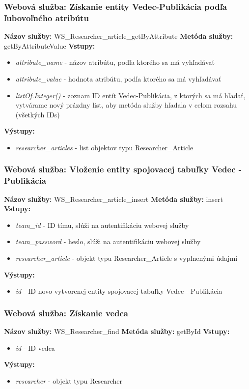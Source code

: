 \documentclass[10pt,oneside,slovak,a4paper]{article}
\begin{document}
\subsubsection{Webová služba: Získanie entity Vedec-Publikácia podľa ľubovoľného atribútu}
\textbf{Názov služby:} WS\_Researcher\_article\_getByAttribute
\textbf{Metóda služby:} getByAttributeValue
\textbf{Vstupy:}
	\begin{itemize}
		\item \textit{attribute\_name} - názov atribútu, podľa ktorého sa má vyhľadávať
		\item \textit{attribute\_value} - hodnota atribútu, podľa ktorého sa má vyhľadávať
		\item \textit{listOf.Integer()} - zoznam ID entít Vedec-Publikácia, z ktorých sa má hľadať, vytvárame nový prázdny list, aby metóda služby hľadala v celom rozsahu (všetkých IDs)
	\end{itemize}
\textbf{Výstupy:}
	\begin{itemize}
		\item \textit{researcher\_articles} - list objektov typu Researcher\_Article
	\end{itemize}
	
\subsubsection{Webová služba: Vloženie entity spojovacej tabuľky Vedec - Publikácia}
\textbf{Názov služby:} WS\_Researcher\_article\_insert
\textbf{Metóda služby:} insert
\textbf{Vstupy:}
	\begin{itemize}
		\item \textit{team\_id} - ID tímu, slúži na autentifikáciu webovej služby
		\item \textit{team\_password} - heslo, slúži na autentifikáciu webovej služby
		\item \textit{researcher\_article} - objekt typu Researcher\_Article s vyplnenými údajmi
	\end{itemize}
\textbf{Výstupy:}
	\begin{itemize}
		\item \textit{id} - ID novo vytvorenej entity spojovacej tabuľky Vedec - Publikácia
	\end{itemize}

\subsubsection{Webová služba: Získanie vedca}
\textbf{Názov služby:} WS\_Researcher\_find
\textbf{Metóda služby:} getById
\textbf{Vstupy:}
	\begin{itemize}
		\item \textit{id} - ID vedca
	\end{itemize}
\textbf{Výstupy:}
	\begin{itemize}
		\item \textit{researcher} - objekt typu Researcher
	\end{itemize}
\end{document}
